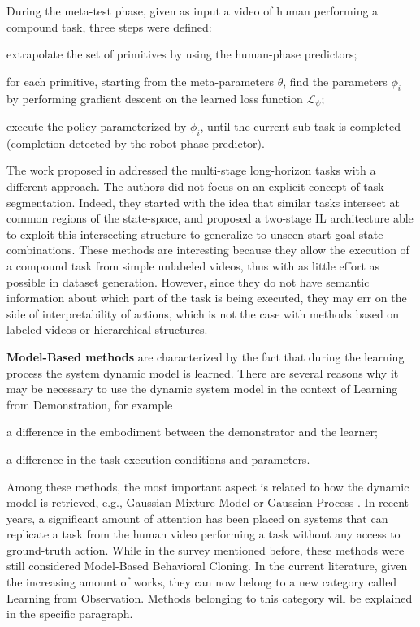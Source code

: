 \begin{enumerate*}[label=(\textbf{\arabic*})]
\end{enumerate*} During the meta-test phase, given as input a video of human performing a compound task, three steps were defined: \begin{enumerate*}[label=(\textbf{\arabic*})]
    \item extrapolate the set of primitives by using the human-phase predictors;
    \item for each primitive, starting from the meta-parameters $\theta$, find the parameters $\phi_{i}$ by performing gradient descent on the learned loss function $\mathcal{L}_{\psi}$;
    \item execute the policy parameterized by $\phi_{i}$, until the current sub-task is completed (completion detected by the robot-phase predictor).
\end{enumerate*} The work proposed in \cite{Mandlekar2020GTI} addressed the multi-stage long-horizon tasks with a different approach. The authors did not focus on an explicit concept of task segmentation. Indeed, they started with the idea that similar tasks intersect at common regions of the state-space, and proposed a two-stage IL architecture able to exploit this intersecting structure to generalize to unseen start-goal state combinations. These methods are interesting because they allow the execution of a compound task from simple unlabeled videos, thus with as little effort as possible in dataset generation. However, since they do not have semantic information about which part of the task is being executed, they may err on the side of interpretability of actions, which is not the case with methods based on labeled videos or hierarchical structures.

\textbf{Model-Based methods} are characterized by the fact that during the learning process the system dynamic model is learned. There are several reasons why it may be necessary to use the dynamic system model in the context of Learning from Demonstration, for example \begin{enumerate*}[label=\textbf{(\alph*)}]
    \item a difference in the embodiment between the demonstrator and the learner;
    \item a difference in the task execution conditions and parameters.
\end{enumerate*}
Among these methods, the most important aspect is related to how the dynamic model is retrieved, e.g., Gaussian Mixture Model \cite{grimes2009learning_actions_through_imitation} or Gaussian Process \cite{englert2013probabilistic,deisenroth2014multi_task}. In recent years, a significant amount of attention has been placed on systems that can replicate a task from the human video performing a task without any access to ground-truth action. While in the survey mentioned before, these methods were still considered Model-Based Behavioral Cloning. In the current literature, given the increasing amount of works, they can now belong to a new category called Learning from Observation. Methods belonging to this category will be explained in the specific paragraph.  